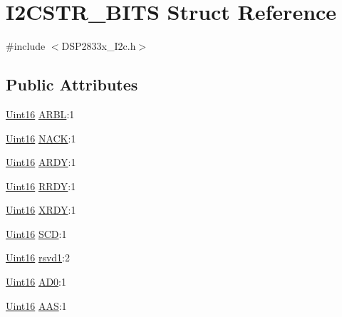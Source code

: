 \hypertarget{struct_i2_c_s_t_r___b_i_t_s}{}\section{I2\+C\+S\+T\+R\+\_\+\+B\+I\+T\+S Struct Reference}
\label{struct_i2_c_s_t_r___b_i_t_s}


{\ttfamily \#include $<$D\+S\+P2833x\+\_\+\+I2c.\+h$>$}

\subsection*{Public Attributes}
\begin{DoxyCompactItemize}
\item 
\hyperlink{_d_s_p2833x___device_8h_a59a9f6be4562c327cbfb4f7e8e18f08b}{Uint16} \hyperlink{struct_i2_c_s_t_r___b_i_t_s_a532ba17217d7a7cf772684c166582a58}{A\+R\+B\+L}\+:1
\item 
\hyperlink{_d_s_p2833x___device_8h_a59a9f6be4562c327cbfb4f7e8e18f08b}{Uint16} \hyperlink{struct_i2_c_s_t_r___b_i_t_s_aaaffa0caac187237bc320bd90f30a4bf}{N\+A\+C\+K}\+:1
\item 
\hyperlink{_d_s_p2833x___device_8h_a59a9f6be4562c327cbfb4f7e8e18f08b}{Uint16} \hyperlink{struct_i2_c_s_t_r___b_i_t_s_a17507e7cb38ed76bfe60ec834805782f}{A\+R\+D\+Y}\+:1
\item 
\hyperlink{_d_s_p2833x___device_8h_a59a9f6be4562c327cbfb4f7e8e18f08b}{Uint16} \hyperlink{struct_i2_c_s_t_r___b_i_t_s_a67f909355e94f211334df80ce7032a5e}{R\+R\+D\+Y}\+:1
\item 
\hyperlink{_d_s_p2833x___device_8h_a59a9f6be4562c327cbfb4f7e8e18f08b}{Uint16} \hyperlink{struct_i2_c_s_t_r___b_i_t_s_a9aba77dabb5660ab8f6b7f31da075749}{X\+R\+D\+Y}\+:1
\item 
\hyperlink{_d_s_p2833x___device_8h_a59a9f6be4562c327cbfb4f7e8e18f08b}{Uint16} \hyperlink{struct_i2_c_s_t_r___b_i_t_s_a00d0541ce7b3c446100e7adfc49bf29f}{S\+C\+D}\+:1
\item 
\hyperlink{_d_s_p2833x___device_8h_a59a9f6be4562c327cbfb4f7e8e18f08b}{Uint16} \hyperlink{struct_i2_c_s_t_r___b_i_t_s_ac58fb6602977fa71091a105964fe7e6b}{rsvd1}\+:2
\item 
\hyperlink{_d_s_p2833x___device_8h_a59a9f6be4562c327cbfb4f7e8e18f08b}{Uint16} \hyperlink{struct_i2_c_s_t_r___b_i_t_s_a3a4dfae78c9e35d9ceac0daf32aaddae}{A\+D0}\+:1
\item 
\hyperlink{_d_s_p2833x___device_8h_a59a9f6be4562c327cbfb4f7e8e18f08b}{Uint16} \hyperlink{struct_i2_c_s_t_r___b_i_t_s_a45b432d7da469e485e328c5040f40dda}{A\+A\+S}\+:1

\end{DoxyCompactItemize}
